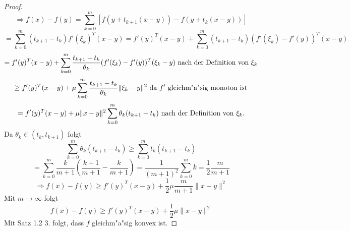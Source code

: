 \begin{proof}
\begin{equation*}
		\end{equation*}
		\begin{displaymath}
		\Rightarrow f(x)-f(y)=\sum_{k=0}^{m}[f(y+t_{k+1}(x-y))-f(y+t_k(x-y))]
		\end{displaymath}
		\begin{displaymath}
		=\sum_{k=0}^{m}(t_{k+1}-t_k)f'(\xi_k)^T(x-y)=f'(y)^T(x-y)+\sum_{k=0}^{m}(t_{k+1}-t_k)(f'(\xi_k)-f'(y))^T(x-y)
		\end{displaymath}
		\begin{displaymath}
		=f'(y)^T(x-y)+\sum_{k=0}^{m} \frac{t_{k+1}-t_k}{\theta_k}(f'(\xi_k)-f'(y))^T(\xi_k-y) \textnormal{ nach der Definition von $\xi_k$}
		\end{displaymath}
		\begin{displaymath}
		\geq f'(y)^T(x-y)+\mu \sum_{k=0}^{m} \frac{t_{k+1}-t_k}{\theta_k} \| \xi_k -y\|^2 \textnormal { da $f'$ gleichm"a"sig monoton ist}
		\end{displaymath}
		\begin{displaymath}
		= f'(y)^T(x-y)+\mu \|x-y \|^2 \sum_{k=0}^{m} \theta_k(t_{k+1}-t_k) \textnormal{ nach der Definition von $\xi_k$}.
		\end{displaymath}
		Da $\theta_k \in (t_k,t_{k+1})$ folgt
		\begin{displaymath}
		\sum_{k=0}^{m} \theta_k(t_{k+1}-t_k) \geq \sum_{k=0}^{m}t_k(t_{k+1}-t_k)
		\end{displaymath}
		\begin{displaymath}
		=\sum_{k=0}^{m}\frac{k}{m+1}\left(\frac{k+1}{m+1}-\frac{k}{m+1}\right)= \frac{1}{(m+1)^2} \sum_{k=0}^{m}k = \frac{1}{2}\frac{m}{m+1}
		\end{displaymath}
		\begin{displaymath}
		\Rightarrow f(x)-f(y) \geq f'(y)^T(x-y)+\frac{1}{2}\mu\frac {m}{m+1} \| x-y \|^2
		\end{displaymath}
		Mit $m\rightarrow\infty$ folgt
		\begin{displaymath}
		f(x)-f(y) \geq f'(y)^T(x-y)+\frac{1}{2}\mu \| x-y \|^2
		\end{displaymath}
		Mit Satz 1.2 3. folgt, dass $f$ gleichm"a"sig konvex ist.
	\end{proof}